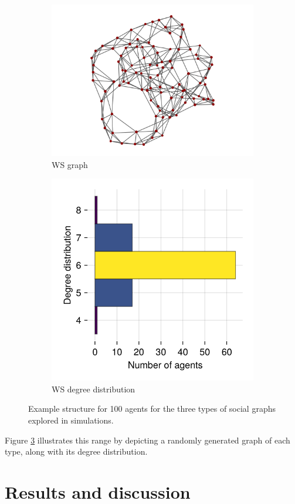 \documentclass[]{article}
\begin{document}
\begin{figure}
	\begin{subfigure}{0.45\textwidth}
		\centering
		\includegraphics[width=0.8\linewidth]{../plots/g_wattsstrogatz_n100_k3_p01_s33} 
		\caption{WS graph}  \label{fig:subim31}
	\end{subfigure}
	\hspace{-1cm}
	\begin{subfigure}{0.45\textwidth}
		\centering
		\includegraphics[width=0.5\linewidth]{../plots/g_wattsstrogatz_hist_degree_n100_k3_p01_s33}
		\caption{WS degree distribution} \label{fig:subim32}
	\end{subfigure}
	
	\caption{Example structure for 100 agents for the three types of social graphs explored in simulations.}
	\label{fig:graphtypes}
\end{figure}

Figure \ref{fig:graphtypes} illustrates this range by depicting a randomly generated graph of each type, along with its degree distribution.

\section{Results and discussion}
\end{document}
